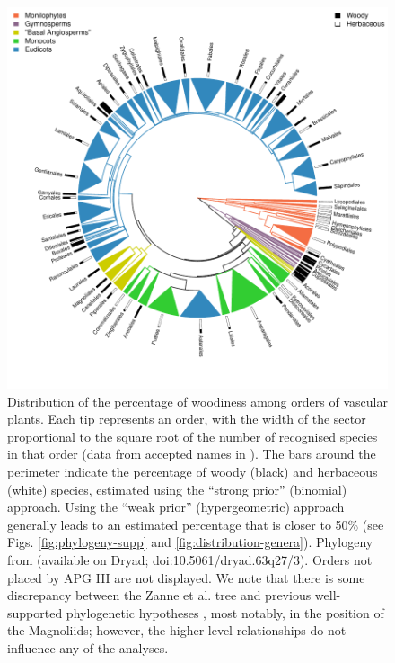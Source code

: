 \begin{figure}[p]
  \centering
  \includegraphics[width=\textwidth]{figs/fraction-on-phylogeny}
  \caption[Distribution of the fraction of woodiness among orders of vascular
  plants I]{Distribution of the percentage of woodiness among orders of
    vascular plants.  Each tip represents an order, with the width of
    the sector proportional to the square root of the number of
    recognised species in that order (data from accepted names in
    \citet{ThePlantList}).  The bars around the perimeter indicate the
    percentage of woody (black) and herbaceous (white) species,
    estimated using the ``strong prior'' (binomial) approach.  Using
    the ``weak prior'' (hypergeometric) approach generally leads to an
    estimated percentage that is closer to 50\% (see Figs.
    \ref{fig:phylogeny-supp} and \ref{fig:distribution-genera}).
    Phylogeny from \citet{Zanne} (available on Dryad; 
    doi:10.5061/dryad.63q27/3). Orders not placed by APG III
    \citep{APG3} are not displayed. We note that there is some discrepancy between
    the Zanne et al. tree and previous well-supported
    phylogenetic hypotheses \citep[e.g.,][]{Soltis2011}, most notably, in the
    position of the Magnoliids; however, the higher-level relationships 
    do not influence any of the analyses.}
\label{fig:phylogeny}
\end{figure}

